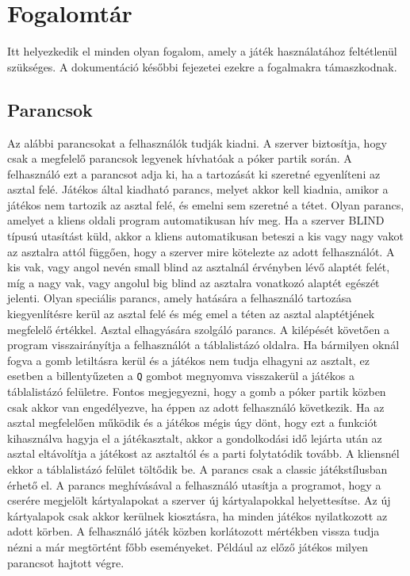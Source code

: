 \section{Fogalomtár}
Itt helyezkedik el minden olyan fogalom, amely a játék használatához feltétlenül szükséges. A dokumentáció későbbi fejezetei ezekre a fogalmakra támaszkodnak.
\subsection{Parancsok}
Az alábbi parancsokat a felhasználók tudják kiadni. A szerver biztosítja, hogy csak a megfelelő parancsok legyenek hívhatóak a póker partik során.
A felhasználó ezt a parancsot adja ki, ha a tartozását ki szeretné egyenlíteni az asztal felé.
Játékos által kiadható parancs, melyet akkor kell kiadnia, amikor a játékos nem tartozik az asztal felé, és emelni sem szeretné a tétet.
Olyan parancs, amelyet a kliens oldali program automatikusan hív meg. Ha a szerver BLIND típusú utasítást küld, akkor a kliens automatikusan beteszi a kis vagy nagy vakot az asztalra attól függően, hogy a szerver mire kötelezte az adott felhasználót. A kis vak, vagy angol nevén small blind az asztalnál érvényben lévő alaptét felét, míg a nagy vak, vagy angolul big blind az asztalra vonatkozó alaptét egészét jelenti.
Olyan speciális parancs, amely hatására a felhasználó tartozása kiegyenlítésre kerül az asztal felé és még emel a téten az asztal alaptétjének megfelelő értékkel.
Asztal elhagyására szolgáló parancs. A kilépését követően a program visszairányítja a felhasználót a táblalistázó oldalra. Ha bármilyen oknál fogva a gomb letiltásra kerül és a játékos nem tudja elhagyni az asztalt, ez esetben a billentyűzeten a \texttt{Q} gombot megnyomva visszakerül a játékos a táblalistázó felületre. Fontos megjegyezni, hogy a gomb a póker partik közben csak akkor van engedélyezve, ha éppen az adott felhasználó következik. Ha az asztal megfelelően működik és a játékos mégis úgy dönt, hogy ezt a funkciót kihasználva hagyja el a játékasztalt, akkor a gondolkodási idő lejárta után az asztal eltávolítja a játékost az asztaltól és a parti folytatódik tovább. A kliensnél ekkor a táblalistázó felület töltődik be.
A parancs csak a classic játékstílusban érhető el. A parancs meghívásával a felhasználó utasítja a programot, hogy a cserére megjelölt kártyalapokat a szerver új kártyalapokkal helyettesítse. Az új kártyalapok csak akkor kerülnek kiosztásra, ha minden játékos nyilatkozott az adott körben.
A felhasználó játék közben korlátozott mértékben vissza tudja nézni a már megtörtént főbb eseményeket. Például az előző játékos milyen parancsot hajtott végre.
